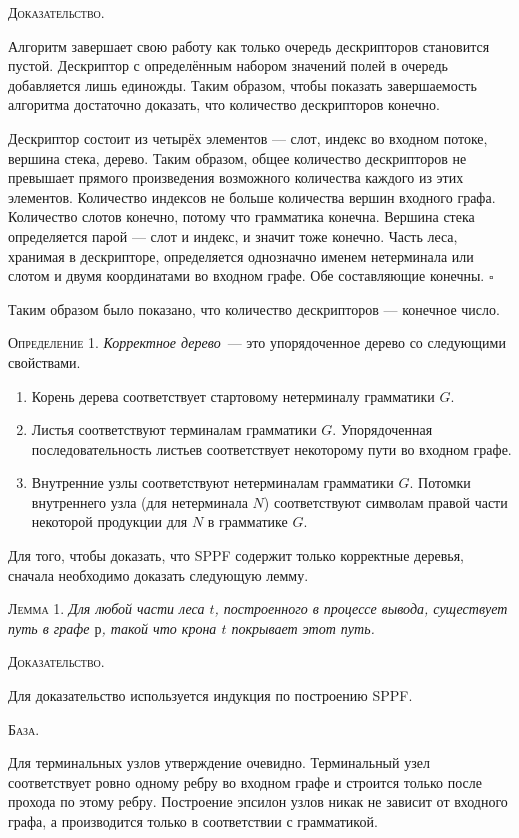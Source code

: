 \textsc{Доказательство.}

Алгоритм завершает свою работу как только очередь дескрипторов становится пустой. Дескриптор с определённым набором значений полей в очередь добавляется лишь единожды. Таким образом, чтобы показать завершаемость алгоритма достаточно доказать, что количество дескрипторов конечно. 

Дескриптор состоит из четырёх элементов --- слот, индекс во входном потоке, вершина стека, дерево. Таким образом, общее количество дескрипторов не превышает прямого произведения возможного количества каждого из этих элементов. Количество индексов не больше количества вершин входного графа. Количество слотов конечно, потому что грамматика конечна. Вершина стека определяется парой --- слот и индекс, и значит тоже конечно. Часть леса, хранимая в дескрипторе, определяется однозначно именем нетерминала или слотом и двумя координатами во входном графе. Обе составляющие конечны. $\square$

Таким образом было показано, что количество дескрипторов --- конечное число.

\textsc{Определение 1.} 
\emph{Корректное дерево}~--- это упорядоченное дерево со следующими свойствами.
\begin{enumerate}
  \item Корень дерева соответствует стартовому нетерминалу грамматики $G$.
  \item Листья соответствуют терминалам грамматики $G$. Упорядоченная последовательность листьев соответствует некоторому пути во входном графе.
  \item Внутренние узлы соответствуют нетерминалам грамматики $G$. Потомки внутреннего узла (для нетерминала $N$) соответствуют символам правой части некоторой продукции для $N$ в грамматике $G$.
\end{enumerate}

Для того, чтобы доказать, что SPPF содержит только корректные деревья, сначала необходимо доказать следующую лемму.

\textsc{Лемма 1.} 
\textit{Для любой части леса $t$, построенного в процессе вывода, существует путь в графе $р$, такой что крона $t$ покрывает этот путь. }

\textsc{Доказательство.}

Для доказательство используется индукция по построению SPPF. 

\textsc{База.}

Для терминальных узлов утверждение очевидно. Терминальный узел соответствует ровно одному ребру во входном графе и строится только после прохода по этому ребру. Построение эпсилон узлов никак не зависит от входного графа, а производится только в соответствии с грамматикой. 

